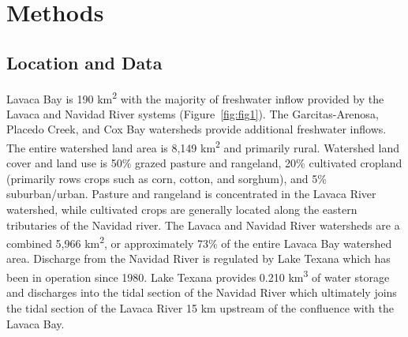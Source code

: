 \documentclass[sn-basic,referee,lineno,pdflatex]{sn-jnl}
\begin{document}
\hypertarget{sec2}{%
\section{Methods}\label{sec2}}

\hypertarget{location-and-data}{%
\subsection{Location and Data}\label{location-and-data}}

Lavaca Bay is 190 km\textsuperscript{2} with the majority of freshwater
inflow provided by the Lavaca and Navidad River systems
(Figure~\ref{fig:fig1}). The Garcitas-Arenosa, Placedo Creek, and Cox
Bay watersheds provide additional freshwater inflows. The entire
watershed land area is 8,149 km\textsuperscript{2} and primarily rural.
Watershed land cover and land use is 50\% grazed pasture and rangeland,
20\% cultivated cropland (primarily rows crops such as corn, cotton, and
sorghum), and 5\% suburban/urban. Pasture and rangeland is concentrated
in the Lavaca River watershed, while cultivated crops are generally
located along the eastern tributaries of the Navidad river. The Lavaca
and Navidad River watersheds are a combined 5,966 km\textsuperscript{2},
or approximately 73\% of the entire Lavaca Bay watershed area. Discharge
from the Navidad River is regulated by Lake Texana which has been in
operation since 1980. Lake Texana provides 0.210 km\textsuperscript{3}
of water storage and discharges into the tidal section of the Navidad
River which ultimately joins the tidal section of the Lavaca River 15 km
upstream of the confluence with the Lavaca Bay.
\end{document}
